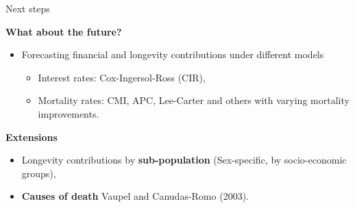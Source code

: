 \documentclass[10pt]{beamer}
\begin{document}
\begin{frame}{Next steps}

\textbf{What about the future?}

\begin{itemize}
	\item Forecasting financial and longevity contributions under different models \pause
	\begin{itemize}
		\item Interest rates: Cox-Ingersol-Ross (CIR), \pause
		\item Mortality rates: CMI, APC, Lee-Carter and others with varying mortality improvements. \pause
	\end{itemize} 
\end{itemize}


\textbf{Extensions} \pause
\begin{itemize}
	\item Longevity contributions by \textbf{sub-population} (Sex-specific, by socio-economic groups), \pause
	\item \textbf{Causes of death} {\scriptsize Vaupel and Canudas-Romo (2003)}.
\end{itemize}


\end{frame}
\end{document}
